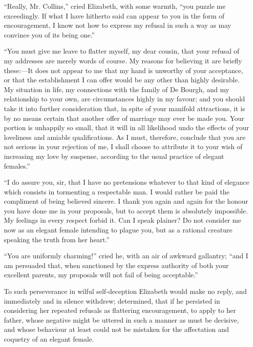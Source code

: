 ``Really, Mr. Collins,'' cried Elizabeth, with some warmth, ``you puzzle me exceedingly. If what I have hitherto said can appear to you in the form of encouragement, I know not how to express my refusal in such a way as may convince you of its being one.''

``You must give me leave to flatter myself, my dear cousin, that your refusal of my addresses are merely words of course. My reasons for believing it are briefly these:---It does not appear to me that my hand is unworthy of your acceptance, or that the establishment I can offer would be any other than highly desirable. My situation in life, my connections with the family of De Bourgh, and my relationship to your own, are circumstances highly in my favour; and you should take it into further consideration that, in spite of your manifold attractions, it is by no means certain that another offer of marriage may ever be made you. Your portion is unhappily so small, that it will in all likelihood undo the effects of your loveliness and amiable qualifications. As I must, therefore, conclude that you are not serious in your rejection of me, I shall choose to attribute it to your wish of increasing my love by suspense, according to the usual practice of elegant females.''

``I do assure you, sir, that I have no pretensions whatever to that kind of elegance which consists in tormenting a respectable man. I would rather be paid the compliment of being believed sincere. I thank you again and again for the honour you have done me in your proposals, but to accept them is absolutely impossible. My feelings in every respect forbid it. Can I speak plainer? Do not consider me now as an elegant female intending to plague you, but as a rational creature speaking the truth from her heart.''

``You are uniformly charming!'' cried he, with an air of awkward gallantry; ``and I am persuaded that, when sanctioned by the express authority of both your excellent parents, my proposals will not fail of being acceptable.''

To such perseverance in wilful self-deception Elizabeth would make no reply, and immediately and in silence withdrew; determined, that if he persisted in considering her repeated refusals as flattering encouragement, to apply to her father, whose negative might be uttered in such a manner as must be decisive, and whose behaviour at least could not be mistaken for the affectation and coquetry of an elegant female.


